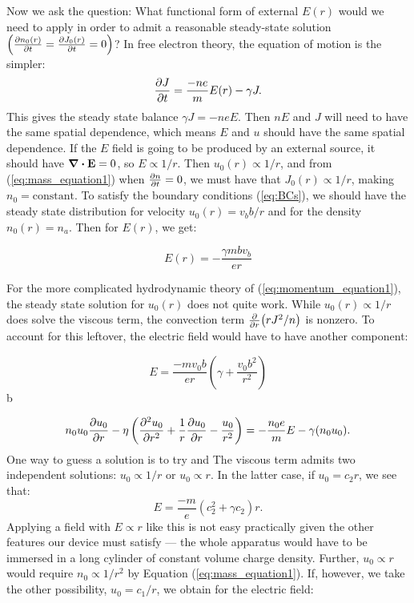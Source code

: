 \documentclass[12pt]{article}
\begin{document}
Now we ask the question: What functional form of external $E(r)$ would we need to apply in order to admit a reasonable steady-state solution $\left(\pdv{n_0(r)}{t}=\pdv{J_0(r)}{t}=0\right)$?  In free electron theory, the equation of motion is the simpler:
\begin{equation*}
    \pdv{J}{t} = \frac{-ne}{m}E(r) - \gamma J.
\end{equation*}
This gives the steady state balance $\gamma J = -neE$.  Then $nE$ and $J$ will need to have the same spatial dependence, which means $E$ and $u$ should have the same spatial dependence.  If the $E$ field is going to be produced by an external source, it should have $\div \vb{E}=0$, so $E \propto 1 / r$.  Then $u_0(r) \propto 1/r$, and from (\ref{eq:mass_equation1}) when $\pdv{n}{t}=0$, we must have that $J_0(r)\propto 1 / r$, making $n_0=\mathrm{constant}$. To satisfy the boundary conditions (\ref{eq:BCs}), we should have the steady state distribution for velocity $u_0(r)=v_b b/r$ and for the density $n_0(r)=n_a$.  Then for $E(r)$, we get:

\begin{equation}
    \label{eq:E1}
    E(r) = -\frac{\gamma m b v_b}{er}
\end{equation}

For the more complicated hydrodynamic theory of (\ref{eq:momentum_equation1}), the steady state solution for $u_0(r)$ does not quite work.  While $u_0(r)\propto1/r$ does solve the viscous term, the convection term $\pdv{r}(rJ^2/n)$ is nonzero.  To account for this leftover, the electric field would have to have another component:

\begin{equation}
    \label{eq:Efield_option2}
    E = \frac{-mv_0 b}{er}\left(\gamma + \frac{v_0b^2}{r^2}\right)
\end{equation}
b


\begin{equation}
    \label{eq:balance}
    n_0 u_0 \pdv{u_0}{r}-\eta\left(\pdv[2]{u_0}{r}+\frac{1}{r}\pdv{u_0}{r}-\frac{u_0}{r^2}\right)=-\frac{n_0e}{m}E-\gamma(n_0u_0).
\end{equation}
One way to guess a solution is to try and The viscous term admits two independent solutions: $u_0\propto 1/r$ or $u_0 \propto r$.  In the latter case, if $u_0=c_2r$, we see that:
\begin{equation*}
    E = \frac{-m}{e} \left( c_2^2 + \gamma c_2  \right)r.
\end{equation*}
Applying a field with $E \propto r$ like this is not easy practically given the other features our device must satisfy --- the whole apparatus would have to be immersed in a long cylinder of constant volume charge density.  Further, $u_0 \propto r$ would require $n_0 \propto 1/r^2$ by Equation (\ref{eq:mass_equation1}).  If, however, we take the other possibility, $u_0 = c_1/r$, we obtain for the electric field:
\end{document}
